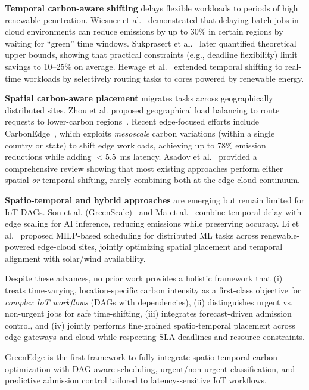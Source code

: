 \documentclass[lettersize,journal]{IEEEtran}
\begin{document}
\textbf{Temporal carbon-aware shifting} delays flexible workloads to periods of high renewable penetration. Wiesner et al.~\cite{10.1145/3464298.3493399} demonstrated that delaying batch jobs in cloud environments can reduce emissions by up to 30\% in certain regions by waiting for ``green'' time windows. Sukprasert et al.~\cite{10.1145/3627703.3650079} later quantified theoretical upper bounds, showing that practical constraints (e.g., deadline flexibility) limit savings to 10--25\% on average. Hewage et al.~\cite{11007290} extended temporal shifting to real-time workloads by selectively routing tasks to cores powered by renewable energy.

\textbf{Spatial carbon-aware placement} migrates tasks across geographically distributed sites. Zhou et al. proposed geographical load balancing to route requests to lower-carbon regions~\cite{zhou2013carbon}. Recent edge-focused efforts include CarbonEdge~\cite{10.1145/3731545.3731576}, which exploits \emph{mesoscale} carbon variations (within a single country or state) to shift edge workloads, achieving up to 78\% emission reductions while adding $<$5.5\, ms latency. Asadov et al.~\cite{asadov2025carbon} provided a comprehensive review showing that most existing approaches perform either spatial \emph{or} temporal shifting, rarely combining both at the edge-cloud continuum.

\textbf{Spatio-temporal and hybrid approaches} are emerging but remain limited for IoT DAGs. Son et al. (GreenScale)~\cite{10947475} and Ma et al.~\cite{ma2025greening} combine temporal delay with edge scaling for AI inference, reducing emissions while preserving accuracy. Li et al.~\cite{li2024energy} proposed MILP-based scheduling for distributed ML tasks across renewable-powered edge-cloud sites, jointly optimizing spatial placement and temporal alignment with solar/wind availability.

Despite these advances, no prior work provides a holistic framework that (i) treats time-varying, location-specific carbon intensity as a first-class objective for \emph{complex IoT workflows} (DAGs with dependencies), (ii) distinguishes urgent vs. non-urgent jobs for safe time-shifting, (iii) integrates forecast-driven admission control, and (iv) jointly performs fine-grained spatio-temporal placement across edge gateways and cloud while respecting SLA deadlines and resource constraints.


GreenEdge is the first framework to fully integrate spatio-temporal carbon optimization with DAG-aware scheduling, urgent/non-urgent classification, and predictive admission control tailored to latency-sensitive IoT workflows.
\end{document}

